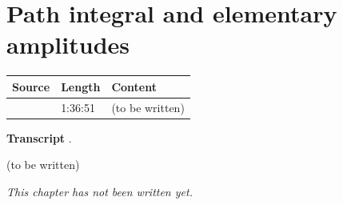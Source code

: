 \chapter{Path integral and elementary amplitudes}\label{ch:c02}
\begin{paracol}{2}

\begin{sources}
\begin{tabularx}{\linewidth}{@{}l l L@{}}
\toprule
\textbf{Source} & \textbf{Length} & \textbf{Content}\\
\midrule
{} & 1:36:51 & (to be written)\\
\bottomrule
\end{tabularx}

\smallskip
\textbf{Transcript} .
\end{sources}

\begin{reading}
(to be written)
\end{reading}

\emph{This chapter has not been written yet.}

\flushside
\end{paracol}
